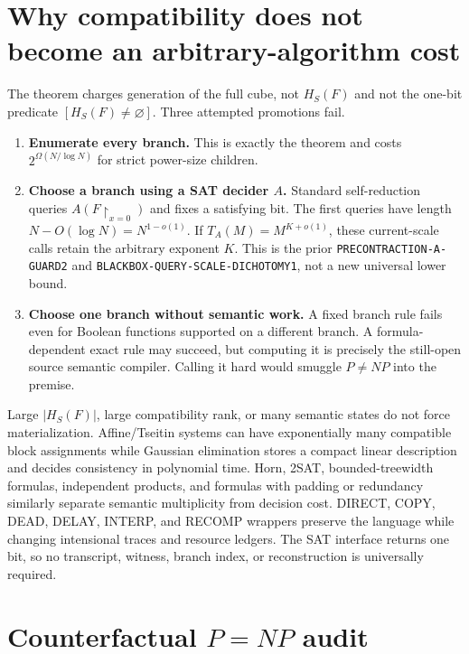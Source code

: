 \documentclass[11pt]{article}
\begin{document}
\section{Why compatibility does not become an arbitrary-algorithm cost}

The theorem charges generation of the full cube, not $H_S(F)$ and not the
one-bit predicate $[H_S(F)\ne\varnothing]$.  Three attempted promotions fail.

\begin{enumerate}[leftmargin=1.6em]
\item \textbf{Enumerate every branch.}  This is exactly the theorem and costs
  $2^{\Omega(N/\log N)}$ for strict power-size children.
\item \textbf{Choose a branch using a SAT decider $A$.}  Standard
  self-reduction queries $A(F\!\upharpoonright_{x=0})$ and fixes a satisfying
  bit.  The first queries have length $N-O(\log N)=N^{1-o(1)}$.  If
  $T_A(M)=M^{K+o(1)}$, these current-scale calls retain the arbitrary exponent
  $K$.  This is the prior \texttt{PRECONTRACTION-A-GUARD2} and
  \texttt{BLACKBOX-QUERY-SCALE-DICHOTOMY1}, not a new universal lower bound.
\item \textbf{Choose one branch without semantic work.}  A fixed branch rule
  fails even for Boolean functions supported on a different branch.  A
  formula-dependent exact rule may succeed, but computing it is precisely
  the still-open source semantic compiler.  Calling it hard would smuggle
  $P\ne NP$ into the premise.
\end{enumerate}

Large $|H_S(F)|$, large compatibility rank, or many semantic states do not
force materialization.  Affine/Tseitin systems can have exponentially many
compatible block assignments while Gaussian elimination stores a compact
linear description and decides consistency in polynomial time.  Horn, 2SAT,
bounded-treewidth formulas, independent products, and formulas with padding
or redundancy similarly separate semantic multiplicity from decision cost.
DIRECT, COPY, DEAD, DELAY, INTERP, and RECOMP wrappers preserve the language
while changing intensional traces and resource ledgers.  The SAT interface
returns one bit, so no transcript, witness, branch index, or reconstruction
is universally required.

\section{Counterfactual $P=NP$ audit}
\end{document}

